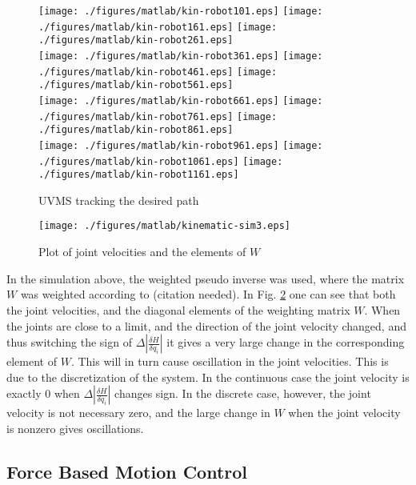 \newcommand{\rscale}{0.18}
\begin{figure}[h!]
	\centering

		\texttt{[image: ./figures/matlab/kin-robot101.eps]}
		\texttt{[image: ./figures/matlab/kin-robot161.eps]}
		\texttt{[image: ./figures/matlab/kin-robot261.eps]} \\
	
		\texttt{[image: ./figures/matlab/kin-robot361.eps]}
		\texttt{[image: ./figures/matlab/kin-robot461.eps]}
		\texttt{[image: ./figures/matlab/kin-robot561.eps]} \\
		
		\texttt{[image: ./figures/matlab/kin-robot661.eps]}
		\texttt{[image: ./figures/matlab/kin-robot761.eps]}
		\texttt{[image: ./figures/matlab/kin-robot861.eps]}
		\\
		\texttt{[image: ./figures/matlab/kin-robot961.eps]}
		\texttt{[image: ./figures/matlab/kin-robot1061.eps]}
		\texttt{[image: ./figures/matlab/kin-robot1161.eps]}
		
	\caption{UVMS tracking the desired path}
	\label{fig:robo-tracking}
\end{figure}

\begin{figure}[h!]
	\centering
	\texttt{[image: ./figures/matlab/kinematic-sim3.eps]}
	
	\caption{Plot of joint velocities and the elements of $W$ }
	\label{fig:robot-sim3}
\end{figure}

In the simulation above, the weighted pseudo inverse was used, where the matrix $W$ was weighted according to (citation needed). In Fig. \ref{fig:robot-sim3} one can see that both the joint velocities, and the diagonal elements of the weighting matrix $W$. When the joints are close to a limit, and the direction of the joint velocity changed, and thus switching the sign of $\Delta |\frac{\delta H}{\delta q_{i}}|$ it gives a very large change in the corresponding element of $W$. 
This will in turn cause oscillation in the joint velocities. This is due to the discretization of the system. In the continuous case the joint velocity is exactly 0 when $\Delta |\frac{\delta H}{\delta q_{i}}|$ changes sign. In the discrete case, however, the joint velocity is not necessary zero, and the large change in $W$ when the joint velocity is nonzero gives oscillations. 


\subsection{Force Based Motion Control}
